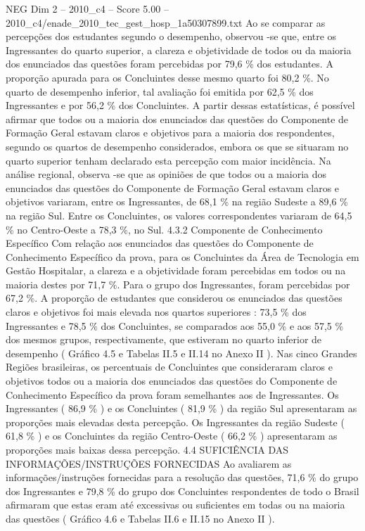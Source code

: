 \begin{textsample}{NEG Dim 2 – 2010\_c4 – Score 5.00 – 2010\_c4/enade\_2010\_tec\_gest\_hosp\_1a50307899.txt}
Ao se comparar as percepções dos estudantes segundo o desempenho, observou -se que, entre os Ingressantes do quarto superior, a clareza e objetividade de todos ou da maioria dos enunciados das questões foram percebidas por 79,6 \% dos estudantes.
A proporção apurada para os Concluintes desse mesmo quarto foi 80,2 \%.
No quarto de desempenho inferior, tal avaliação foi emitida por 62,5 \% dos Ingressantes e por 56,2 \% dos Concluintes.
A partir dessas estatísticas, é possível afirmar que todos ou a maioria dos enunciados das questões do Componente de Formação Geral estavam claros e objetivos para a maioria dos respondentes, segundo os quartos de desempenho considerados, embora os que se situaram no quarto superior tenham declarado esta percepção com maior incidência.
Na análise regional, observa -se que as opiniões de que todos ou a maioria dos enunciados das questões do Componente de Formação Geral estavam claros e objetivos variaram, entre os Ingressantes, de 68,1 \% na região Sudeste a 89,6 \% na região Sul.
Entre os Concluintes, os valores correspondentes variaram de 64,5 \% no Centro-Oeste a 78,3 \%, no Sul. 4.3.2 Componente de Conhecimento Específico Com relação aos enunciados das questões do Componente de Conhecimento Específico da prova, para os Concluintes da Área de Tecnologia em Gestão Hospitalar, a clareza e a objetividade foram percebidas em todos ou na maioria destes por 71,7 \%.
Para o grupo dos Ingressantes, foram percebidas por 67,2 \%.
A proporção de estudantes que considerou os enunciados das questões claros e objetivos foi mais elevada nos quartos superiores : 73,5 \% dos Ingressantes e 78,5 \% dos Concluintes, se comparados aos 55,0 \% e aos 57,5 \% dos mesmos grupos, respectivamente, que estiveram no quarto inferior de desempenho ( Gráfico 4.5 e Tabelas II.5 e II.14 no Anexo II ).
Nas cinco Grandes Regiões brasileiras, os percentuais de Concluintes que consideraram claros e objetivos todos ou a maioria dos enunciados das questões do Componente de Conhecimento Específico da prova foram semelhantes aos de Ingressantes.
Os Ingressantes ( 86,9 \% ) e os Concluintes ( 81,9 \% ) da região Sul apresentaram as proporções mais elevadas desta percepção.
Os Ingressantes da região Sudeste ( 61,8 \% ) e os Concluintes da região Centro-Oeste ( 66,2 \% ) apresentaram as proporções mais baixas dessa percepção. 4.4 SUFICIÊNCIA DAS INFORMAÇÕES/INSTRUÇÕES FORNECIDAS Ao avaliarem as informações/instruções fornecidas para a resolução das questões, 71,6 \% do grupo dos Ingressantes e 79,8 \% do grupo dos Concluintes respondentes de todo o Brasil afirmaram que estas eram até excessivas ou suficientes em todas ou na maioria das questões ( Gráfico 4.6 e Tabelas II.6 e II.15 no Anexo II ).

\end{textsample}
